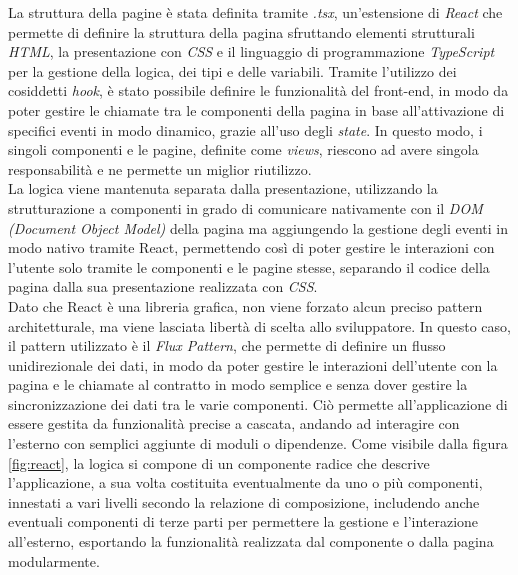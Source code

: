 La struttura della pagine è stata definita tramite \textit{.tsx}, un'estensione di \textit{React} che permette di definire la struttura della pagina 
sfruttando elementi strutturali \textit{HTML}, la presentazione con \textit{CSS} e il linguaggio di programmazione \textit{TypeScript} per la gestione della logica, dei tipi e delle variabili.
Tramite l'utilizzo dei cosiddetti \textit{hook}, è stato possibile definire le funzionalità del front-end, in modo da poter gestire le chiamate tra le componenti della 
pagina in base all'attivazione di specifici eventi in modo dinamico, grazie all'uso degli \textit{state}.
In questo modo, i singoli componenti e le pagine, definite come \textit{views}, riescono ad avere singola responsabilità e ne permette un miglior riutilizzo. \\

La logica viene mantenuta separata dalla presentazione, utilizzando la strutturazione a componenti in grado di comunicare nativamente con il 
\textit{DOM (Document Object Model)} della pagina ma aggiungendo la gestione degli eventi in modo nativo tramite React, permettendo così di poter gestire le interazioni con l'utente
solo tramite le componenti e le pagine stesse, separando il codice della pagina dalla sua presentazione realizzata con \textit{CSS}. \\

Dato che React è una libreria grafica, non viene forzato alcun preciso pattern architetturale, ma viene lasciata libertà di scelta allo sviluppatore.
In questo caso, il pattern utilizzato è il \textit{Flux Pattern}, che permette di definire un flusso unidirezionale dei dati, in modo da poter gestire
le interazioni dell'utente con la pagina e le chiamate al contratto in modo semplice e senza dover gestire la sincronizzazione dei dati tra le varie componenti.
Ciò permette all'applicazione di essere gestita da funzionalità precise a cascata, andando ad interagire con l'esterno con semplici aggiunte di moduli o dipendenze.
Come visibile dalla figura \ref{fig:react}, la logica si compone di un componente radice che descrive l'applicazione,
a sua volta costituita eventualmente da uno o più componenti, innestati a vari livelli secondo la relazione di composizione,
includendo anche eventuali componenti di terze parti per permettere la gestione e l'interazione all'esterno, esportando la funzionalità realizzata dal componente
o dalla pagina modularmente. \\

